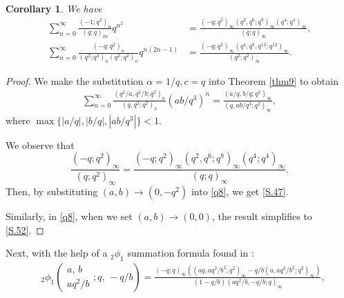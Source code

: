 \documentclass[reqno,12pt]{amsart}
\newtheorem{corollary}[theorem]{Corollary}
\theoremstyle{remark}
\numberwithin{equation}{section}
\begin{document}
%
\begin{corollary}
We have
\begin{align}
\sum_{n=0}^{\infty}\frac{\left(-1;q^2\right)_n}
{\left(q;q\right)_{2n}}q^{n^2}&=
\frac{\left(-q;q^2\right)_{\infty}\left(q^2,q^6;q^{8}\right)_{\infty}
\left(q^4;q^4\right)_{\infty}}
{\left(q;q\right)_{\infty}},
\tag{S.47}\label{S.47}\\
\sum_{n=0}^{\infty}\frac{\left(-q;q^2\right)_n}
{\left(q^2;q^4\right)_{n}\left(q^2;q^2\right)_{n}}q^{n\left(2n-1\right)}
&=
\frac{\left(-q;q^2\right)_{\infty}\left(q^4,q^8,q^{12};q^{12}\right)_{\infty}}
{\left(q^2;q^2\right)_{\infty}}.
\tag{S.52}\label{S.52}
\end{align}
\end{corollary}
\begin{proof}
We make the substitution $\alpha=1/q, c=q$ into Theorem \ref{thm9}
to obtain
\begin{align}
\sum_{n=0}^{\infty}\frac{\left(q^2/a,q^2/b;q^2\right)_{n}}
{\left(q,q^2;q^2\right)_n}\left(ab/q^3\right)^n
=\frac{\left(a/q,b/q;q^2\right)_{\infty}}
{\left(q,ab/q^3;q^2\right)_{\infty}},\label{q8}
\end{align}
where $\max\{|a/q|, |b/q|, |ab/q^3|\}<1$.

We observe that
\begin{equation*}
\frac{\left(-q;q^2\right)_{\infty}}{\left(q;q^2\right)_{\infty}}=
\frac{\left(-q;q^2\right)_{\infty}\left(q^2,q^6;q^{8}\right)_{\infty}
\left(q^4;q^4\right)_{\infty}}
{\left(q;q\right)_{\infty}}.
\end{equation*}
Then, by substituting $\left(a,b\right)\to\left(0,-q^2\right)$ into \eqref{q8}, we get \eqref{S.47}.

Similarly, in \eqref{q8},  when we set $\left(a,b\right)\to\left(0,0\right)$,  the result simplifies to  \eqref{S.52}.
\end{proof}
Next, with the help of a ${_2\phi_1}$ summation formula found in \cite[Eq. (6.125)]{Harsh}:
\begin{align}
&{_2\phi_1}\left(
\begin{array}{cc}
a,\,b\\
aq^2/b
\end{array};q,\,-q/b\right)=\frac{\left(-q;q\right)_{\infty}\left(
\left(aq,aq^2/b^2;q^2\right)_{\infty}-q/b
\left(a,aq^3/b^2;q^2\right)_{\infty}\right)}{\left(1-q/b\right)
\left(aq^2/b,-q/b;q\right)_{\infty}},\label{C1}
\end{align} 
\end{document}
